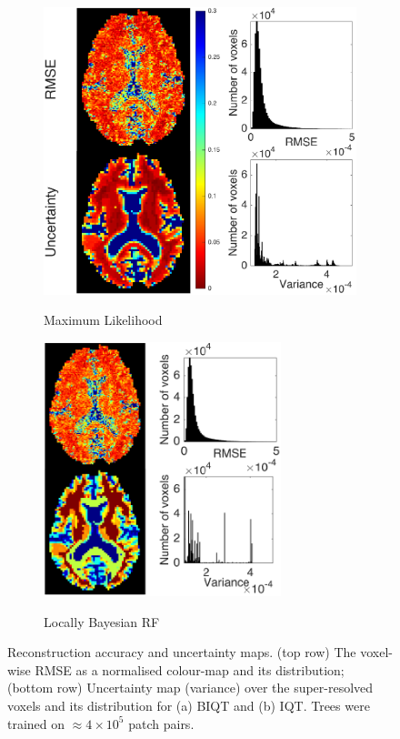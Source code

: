 	\begin{figure}[ht]
		\begin{subfigure}{0.45\textwidth}
			\caption{Maximum Likelihood}
			\includegraphics[width=8 cm]{chapter_2/figure_4.pdf}
			\label{fig:map1}
		\end{subfigure}
		\hfill
		\begin{subfigure}{0.43\textwidth}
			\caption{Locally Bayesian RF}
			\includegraphics[width=6.9cm]{chapter_2/figure_5.pdf}
			\label{fig:map3}
		\end{subfigure}

		\small\caption[Optional caption for list of figures]{ 
			Reconstruction accuracy and uncertainty maps. (top row) The voxel-wise RMSE as a normalised colour-map and its distribution; (bottom row) Uncertainty map (variance) over the super-resolved voxels and its distribution for (a) BIQT and (b) IQT. Trees were trained on $\approx 4\times10^5$ patch pairs.} 
		\label{fig:confidencemap}
	\end{figure}

